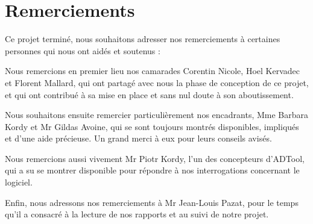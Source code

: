 \section{Remerciements}

Ce projet terminé, nous souhaitons adresser nos remerciements à certaines personnes qui nous ont aidés et soutenus :   

Nous remercions en premier lieu nos camarades Corentin {\sc Nicole}, Hoel {\sc Kervadec} et Florent {\sc Mallard}, qui ont partagé avec nous la phase de conception de ce projet, et qui ont contribué à sa mise en place et sans nul doute à son aboutissement.

Nous souhaitons ensuite remercier particulièrement nos encadrants, Mme Barbara {\sc Kordy} et Mr Gildas {\sc Avoine}, qui se sont toujours montrés disponibles, impliqués et d'une aide précieuse. Un grand merci à eux pour leurs conseils avisés.

Nous remercions aussi vivement Mr Piotr {\sc Kordy}, l'un des concepteurs d'ADTool, qui a su se montrer disponible pour répondre à nos interrogations concernant le logiciel.

Enfin, nous adressons nos remerciements à Mr Jean-Louis {\sc Pazat}, pour le temps qu'il a consacré à la lecture de nos rapports et au suivi de notre projet.